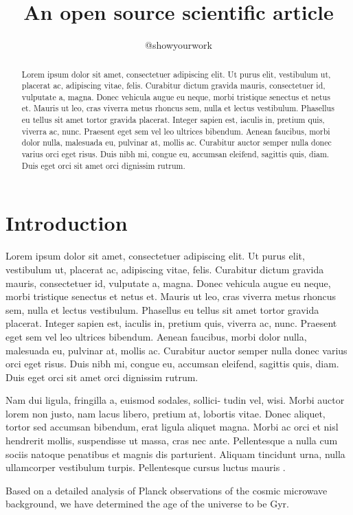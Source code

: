 \documentclass[twocolumn]{aastex631}
\begin{document}
\title{An open source scientific article}

\author{@showyourwork}

\begin{abstract}
    Lorem ipsum dolor sit amet, consectetuer adipiscing elit.
    Ut purus elit, vestibulum ut, placerat ac, adipiscing vitae, felis.
    Curabitur dictum gravida mauris, consectetuer id, vulputate a, magna.
    Donec vehicula augue eu neque, morbi tristique senectus et netus et.
    Mauris ut leo, cras viverra metus rhoncus sem, nulla et lectus vestibulum.
    Phasellus eu tellus sit amet tortor gravida placerat.
    Integer sapien est, iaculis in, pretium quis, viverra ac, nunc.
    Praesent eget sem vel leo ultrices bibendum.
    Aenean faucibus, morbi dolor nulla, malesuada eu, pulvinar at, mollis ac.
    Curabitur auctor semper nulla donec varius orci eget risus.
    Duis nibh mi, congue eu, accumsan eleifend, sagittis quis, diam.
    Duis eget orci sit amet orci dignissim rutrum.
\end{abstract}

\section{Introduction}
\label{sec:intro}

Lorem ipsum dolor sit amet, consectetuer adipiscing elit.
Ut purus elit, vestibulum ut, placerat ac, adipiscing vitae, felis.
Curabitur dictum gravida mauris, consectetuer id, vulputate a, magna.
Donec vehicula augue eu neque, morbi tristique senectus et netus et.
Mauris ut leo, cras viverra metus rhoncus sem, nulla et lectus vestibulum.
Phasellus eu tellus sit amet tortor gravida placerat.
Integer sapien est, iaculis in, pretium quis, viverra ac, nunc.
Praesent eget sem vel leo ultrices bibendum.
Aenean faucibus, morbi dolor nulla, malesuada eu, pulvinar at, mollis ac.
Curabitur auctor semper nulla donec varius orci eget risus.
Duis nibh mi, congue eu, accumsan eleifend, sagittis quis, diam.
Duis eget orci sit amet orci dignissim rutrum.

Nam dui ligula, fringilla a, euismod sodales, sollici- tudin vel, wisi.
Morbi auctor lorem non justo, nam lacus libero, pretium at, lobortis vitae.
Donec aliquet, tortor sed accumsan bibendum, erat ligula aliquet magna.
Morbi ac orci et nisl hendrerit mollis, suspendisse ut massa, cras nec ante.
Pellentesque a nulla cum sociis natoque penatibus et magnis dis parturient.
Aliquam tincidunt urna, nulla ullamcorper vestibulum turpis.
Pellentesque cursus luctus mauris \citep{Luger2021}.



Based on a detailed analysis of Planck observations of the cosmic microwave background, we have determined the age of the universe to be  Gyr.
\end{document}
